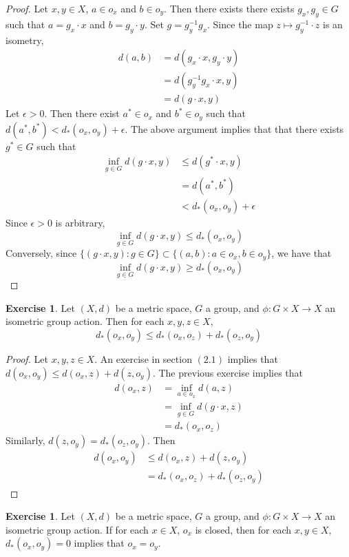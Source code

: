 \documentclass[12pt]{amsart}
\theoremstyle{definition}
\newtheorem{ex}[definition]{Exercise}
\newcommand{\ep}{\epsilon}
\begin{document}
	\begin{proof}
	Let $x, y \in X$, $a \in o_x$ and $b \in o_y$. Then there exists there exists $g_x, g_y \in G$ such that $a = g_x \cdot x$ and $b = g_y \cdot y$. Set $g = g_y^{-1}g_x$. Since the map $z \mapsto g_y^{-1} \cdot z$ is an isometry, 
	\begin{align*}
	d(a,b) 
	&= d(g_x \cdot x, g_y \cdot y) \\
	&= d(g_y^{-1}g_x \cdot x, y)\\
	&= d(g\cdot x, y)
	\end{align*}
	Let $\ep >0$. Then there exist $a^* \in o_x$ and $b^* \in o_y$ such that $d(a^*,b^*) < d_*(o_x,o_y) + \ep$. The above argument implies that that there exists $g^* \in G$ such that 
	\begin{align*} 
	\inf_{g \in G} d(g \cdot x, y) 
	& \leq d(g^* \cdot x, y) \\
	&= d(a^*, b^*) \\
	& < d_*(o_x, o_y) + \ep
\end{align*}	 
	Since $\ep >0$ is arbitrary, $$\inf_{g \in G} d(g \cdot x, y) \leq d_*(o_x, o_y)$$
	Conversely, since $\{(g \cdot x, y): g \in G\} \subset \{(a,b): a \in o_x, b \in o_y\}$, we have that 
	$$\inf_{g \in G} d(g \cdot x, y) \geq d_*(o_x, o_y)$$ 
	\end{proof}
	
	\begin{ex}
	Let $(X, d)$ be a metric space, $G$ a group, and $\phi: G \times X \rightarrow X$ an isometric group action. Then for each $x, y, z \in X$, $$d_*(o_x, o_y) \leq d_*(o_x, o_z) + d_*(o_z, o_y)$$
	\end{ex}
	
	\begin{proof}
	Let $x, y, z \in X$. An exercise in section $(2.1)$ implies that $d(o_x, o_y) \leq d(o_x, z) + d(z, o_y)$. The previous exercise implies that 
	\begin{align*}
	d(o_x, z) 
	&= \inf_{a \in o_x} d(a, z) \\
	&= \inf_{g \in G} d(g \cdot x, z) \\
	&= d_*(o_x, o_z)
	\end{align*}
	Similarly, $d(z, o_y) = d_*(o_z, o_y)$. Then 
	\begin{align*}
	d(o_x, o_y) 
	&\leq d(o_x, z) + d(z, o_y) \\
	&= d_*(o_x, o_z) + d_*(o_z, o_y)
	\end{align*}
	\end{proof}
	
	\begin{ex}
	Let $(X, d)$ be a metric space, $G$ a group, and $\phi: G \times X \rightarrow X$ an isometric group action. If for each $x \in X$, $o_x$ is closed, then for each $x, y \in X$, $d_*(o_x, o_y) =0$ implies that $o_x = o_y$.
	\end{ex}
	
\end{document}
